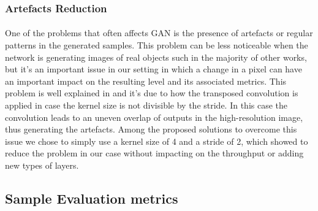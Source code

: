 \subsubsection{Artefacts Reduction}
\label{sec:artefacts-reduction}
\paragraph{} One of the problems that often affects GAN is the presence of artefacts or regular patterns in the generated samples. This problem can be less noticeable when the network is generating images of real objects such in the majority of other works, but it's an important issue in our setting in which a change in a pixel can have an important impact on the resulting level and its associated metrics. This problem is well explained in \cite{artifacts} and it's due to how the transposed convolution is applied in case the kernel size is not divisible by the stride. In this case the convolution leads to an uneven overlap of outputs in the high-resolution image, thus generating the artefacts. Among the proposed solutions to overcome this issue we chose to simply use a kernel size of 4 and a stride of 2, which showed to reduce the problem in our case without impacting on the throughput or adding new types of layers. 

\subsection{Sample Evaluation metrics}
\label{sec:evaluation}
